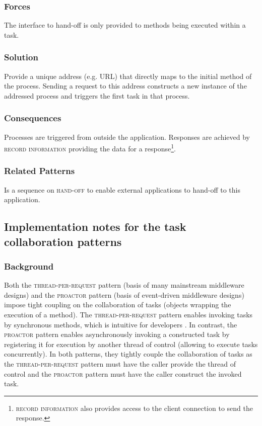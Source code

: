 \documentclass[prodmode]{style/acmlarge}
\begin{document}
\subsubsection*{Forces} The interface to hand-off is only provided to methods
being executed within a task.

\subsubsection*{Solution} Provide a unique address (e.g. URL) that directly maps
to the initial method of the process.  Sending a request to this address
constructs a new instance of the addressed process and triggers the first task
in that process.

\subsubsection*{Consequences} Processes are triggered from outside the
application. Responses are achieved by \textsc{record information} providing the
data for a response\footnote{\textsc{record information} also provides
access to the client connection to send the response.}.

\subsubsection*{Related Patterns} Is a sequence on \textsc{hand-off} to enable
external applications to hand-off to this application.



\subsection{Implementation notes for the task collaboration patterns}

\subsubsection*{Background}

Both the \textsc{thread-per-request} pattern \cite{thread-per-request} (basis of
many mainstream middleware designs) and the \textsc{proactor} pattern
\cite{proactor} (basis of event-driven middleware designs) impose tight
coupling on the collaboration of tasks (objects wrapping the execution of a
method).  The \textsc{thread-per-request} pattern enables invoking tasks by
synchronous methods, which is intuitive for developers \cite{proactor}.
In contrast, the \textsc{proactor} pattern enables asynchronously invoking a
constructed task by registering it for execution by another thread of control
(allowing to execute tasks concurrently).  In both patterns, they tightly couple
the collaboration of tasks as the \textsc{thread-per-request} pattern must have
the caller provide the thread of control and the \textsc{proactor} pattern must
have the caller construct the invoked task.
\end{document}
